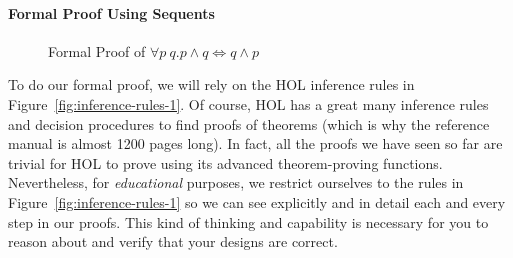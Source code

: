 \paragraph*{Formal Proof Using Sequents}

\begin{figure}[t]
    \centering \begin{footnotesize}
  \end{footnotesize}

    \caption{Formal Proof of $\forall p\:q.p \wedge q \Leftrightarrow q \wedge p$}
\label{fig:proof-1}
\end{figure}

To do our formal proof, we will rely on the HOL inference rules in
Figure~\ref{fig:inference-rules-1}. Of course, HOL has a great many
inference rules and decision procedures to find proofs of theorems
(which is why the reference manual is almost 1200 pages long).  In
fact, all the proofs we have seen so far are trivial for HOL to prove
using its advanced theorem-proving functions. Nevertheless, for
\emph{educational} purposes, we restrict ourselves to the rules in
Figure~\ref{fig:inference-rules-1} so we can see explicitly and in
detail each and every step in our proofs. This kind of thinking and
capability is necessary for you to reason about and verify that your
designs are correct.

